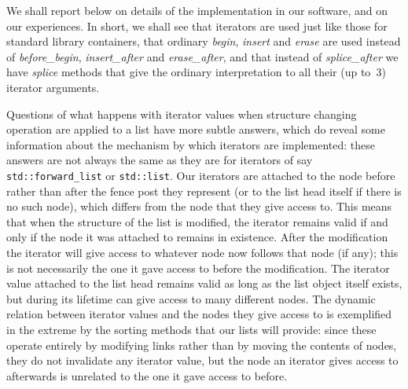 \documentclass[12pt]{article}
\theoremstyle{plain}
\theoremstyle{definition}
\newcommand\std[1]{\texttt{std::#1}}
\def\frwl.{\std{forward\_list}}
\def\insa.{\textit{insert\_\!after}}
\def\ersa.{\textit{erase\_\!after}}
\def\spla.{\textit{splice\_\!after}}
\begin{document}
We shall report below on details of the implementation in our software, and on
our experiences. In short, we shall see that iterators are used just like those
for standard library containers, that ordinary \textit{begin}, \textit{insert}
and \textit{erase} are used instead of \textit{before\_begin}, \insa. and
\ersa., and that instead of \spla. we have \textit{splice} methods that give
the ordinary interpretation to all their (up to~$3$) iterator arguments.

Questions of what happens with iterator values when structure changing operation
are applied to a list have more subtle answers, which do reveal some information
about the mechanism by which iterators are implemented: these answers are not
always the same as they are for iterators of say \frwl. or \std{list}. Our
iterators are attached to the node before rather than after the fence post they
represent (or to the list head itself if there is no such node), which differs
from the node that they give access to. This means that when the structure of
the list is modified, the iterator remains valid if and only if the node it was
attached to remains in existence. After the modification the iterator will give
access to whatever node now follows that node (if any); this is not necessarily
the one it gave access to before the modification. The iterator value attached
to the list head remains valid as long as the list object itself exists, but
during its lifetime can give access to many different nodes. The dynamic
relation between iterator values and the nodes they give access to is
exemplified in the extreme by the sorting methods that our lists will provide:
since these operate entirely by modifying links rather than by moving the
contents of nodes, they do not invalidate any iterator value, but the node an
iterator gives access to afterwards is unrelated to the one it gave access to
before.
\end{document}
